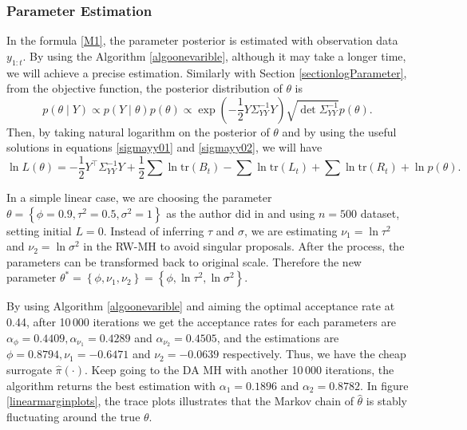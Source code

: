 \subsubsection*{Parameter Estimation}

In the formula \eqref{M1}, the parameter posterior is estimated with observation data $y_{1:t}$. By using the Algorithm \ref{algoonevarible}, although it may take a longer time, we will achieve a precise estimation. Similarly with Section \ref{sectionlogParameter}, from the objective function, the posterior distribution of $\theta$ is 
\begin{equation*}
p(\theta \mid Y) \propto p(Y\mid\theta)p(\theta) \propto \exp\left( {-\frac{1}{2} Y \Sigma_{YY}^{-1} Y } \right) \sqrt{\det \Sigma_{YY}^{-1}} p(\theta).
\end{equation*}
Then, by taking natural logarithm on the posterior of $\theta$ and by using the useful solutions in equations \eqref{sigmayy01} and \eqref{sigmayy02}, we will have
\begin{equation}\label{linearlogL}
\ln L(\theta) = -\frac{1}{2}Y^\top\Sigma_{YY}^{-1}Y+\frac{1}{2}\sum\ln\mbox{tr}(B_t)-\sum\ln\mbox{tr}(L_t)+\sum\ln\mbox{tr}(R_t) + \ln p(\theta).
\end{equation}

In a simple linear case, we are choosing the parameter $\theta = \left\lbrace \phi=0.9,\tau^2=0.5,\sigma^2=1\right\rbrace$ as the author did in \citep{lopes2011particle} and using $n=500$ dataset, setting initial $L=0$. Instead of inferring $\tau$ and $\sigma$, we are estimating $\nu_1 = \ln \tau^2$ and $\nu_2 = \ln \sigma^2$ in the RW-MH to avoid singular proposals. After the process, the parameters can be transformed back to original scale. Therefore the new parameter  $\theta^* =  \left\lbrace \phi,\nu_1,\nu_2\right\rbrace = \left\lbrace \phi,\ln\tau^2,\ln\sigma^2\right\rbrace$. 

By using Algorithm \ref{algoonevarible} and aiming the optimal acceptance rate at 0.44, after 10\,000 iterations we get the acceptance rates for each parameters are $\alpha_\phi = 0.4409, \alpha_{\nu_1}= 0.4289$ and $\alpha_{\nu_2}= 0.4505$, and the estimations are $\phi =0.8794, \nu_1= -0.6471$ and $\nu_2= -0.0639$ respectively. Thus, we have the cheap surrogate $\hat{\pi}(\cdot)$. Keep going to the DA MH with another 10\,000 iterations, the algorithm returns the best estimation with $\alpha_1=0.1896$ and $\alpha_2 = 0.8782$. In figure \ref{linearmarginplots}, the trace plots illustrates that the Markov chain of $\hat{\theta}$ is stably fluctuating around the true $\theta$. 

